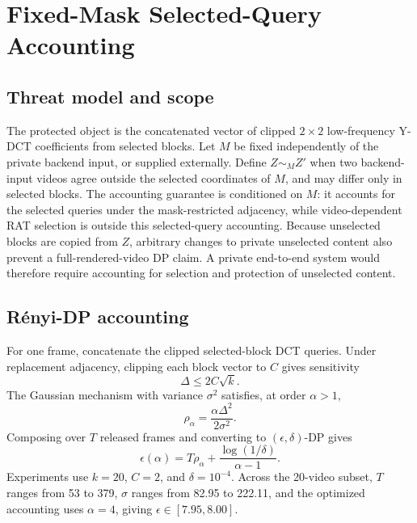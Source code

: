 \section{Fixed-Mask Selected-Query Accounting}
\label{sec:privacy}

\subsection{Threat model and scope}

The protected object is the concatenated vector of clipped \(2\times2\)
low-frequency Y-DCT coefficients from selected blocks. Let \(M\) be fixed
independently of the private backend input, or supplied externally. Define
\(Z\sim_M Z'\) when two backend-input videos agree outside the selected
coordinates of \(M\), and may differ only in selected blocks. The accounting
guarantee is conditioned on \(M\): it accounts for the selected queries under
the mask-restricted adjacency, while video-dependent RAT selection is outside
this selected-query accounting. Because unselected blocks are copied from
\(Z\), arbitrary changes to private unselected content also prevent a
full-rendered-video DP claim. A private end-to-end system would therefore
require accounting for selection and protection of unselected content.

\subsection{R\'enyi-DP accounting}

For one frame, concatenate the clipped selected-block DCT queries. Under
replacement adjacency, clipping each block vector to \(C\) gives sensitivity
\begin{equation}
\Delta \leq 2C\sqrt{k}.
\end{equation}
The Gaussian mechanism with variance \(\sigma^2\) satisfies, at order
\(\alpha>1\),
\begin{equation}
\rho_\alpha=\frac{\alpha\Delta^2}{2\sigma^2}.
\end{equation}
Composing over \(T\) released frames and converting to
\((\epsilon,\delta)\)-DP gives
\begin{equation}
\epsilon(\alpha)=T\rho_\alpha+\frac{\log(1/\delta)}{\alpha-1}.
\end{equation}
Experiments use \(k=20\), \(C=2\), and \(\delta=10^{-4}\). Across the 20-video
subset, \(T\) ranges from 53 to 379, \(\sigma\) ranges from 82.95 to 222.11,
and the optimized accounting uses \(\alpha=4\), giving
\(\epsilon\in[7.95,8.00]\).

